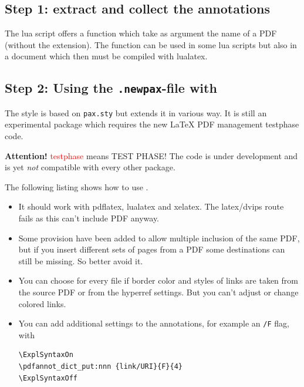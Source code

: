 \documentclass[DIV=12,parskip=half-,bibliography=totoc]{scrartcl}
\begin{document}
\subsection{Step 1: extract and collect the annotations}

The lua script offers a function which take as argument the name of a PDF (without the extension).
The function can be used in some lua scripts but also in a document which then must be compiled
with lualatex. 



\subsection[Step 2: Using the \texttt{.newpax}-file with \pkg{newpax.sty}]
{Step 2: Using the \texttt{.newpax}-file with }

The style  is based on \texttt{pax.sty} but extends it in various way. 
It is still an experimental package which requires the new \LaTeX{} PDF management testphase code.

\textbf{Attention!} \textcolor{red}{testphase} means TEST PHASE! The code is under development and is
yet \emph{not} compatible with every other package.

The following listing shows how to use .

\begin{itemize}
\item It should work with pdflatex, lualatex and xelatex. The latex/dvips route fails as this can't include PDF anyway.
\item Some provision have been added to allow multiple inclusion of the same PDF, but if you insert different sets of pages from a PDF some destinations can still be missing. So better avoid it.
\item You can choose for every file if border color and styles of links are taken from the source PDF or from the hyperref settings. But you can't adjust or change colored links.
\item You can add additional settings to the annotations, for example an \texttt{/F} flag, with

\begin{lstlisting}
\ExplSyntaxOn
\pdfannot_dict_put:nnn {link/URI}{F}{4}
\ExplSyntaxOff
\end{lstlisting}

\end{itemize}
\end{document}
